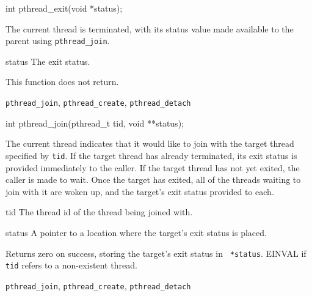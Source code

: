 \begin{apisyn}

	\funcproto int pthread_exit(void *status);
\end{apisyn}
\begin{apidesc}
	The current thread is terminated, with its status value made
	available to the parent using {\tt pthread_join}.
\end{apidesc}
\begin{apiparm}
	\item[status]
		The exit status.
\end{apiparm}
\begin{apiret}
	This function does not return.
\end{apiret}
\begin{apirel}
	{\tt pthread_join}, {\tt pthread_create}, {\tt pthread_detach}
\end{apirel}


\begin{apisyn}

	\funcproto int pthread_join(pthread_t tid, void **status);
\end{apisyn}
\begin{apidesc}
	The current thread indicates that it would like to join with the
	target thread specified by {\tt tid}. If the target thread has
	already terminated, its exit status is provided immediately to the
	caller. If the target thread has not yet exited, the caller is made
	to wait. Once the target has exited, all of the threads waiting to
	join with it are woken up, and the target's exit status provided to
	each.
\end{apidesc}
\begin{apiparm}
	\item[tid]
		The thread id of the thread being joined with.
	\item[status]
		A pointer to a location where the target's exit status is
		placed. 
\end{apiparm}
\begin{apiret}
	Returns zero on success, storing the target's exit status in {\tt
	*status}. EINVAL if {\tt tid} refers to a non-existent thread.
\end{apiret}
\begin{apirel}
	{\tt pthread_join}, {\tt pthread_create}, {\tt pthread_detach}
\end{apirel}


